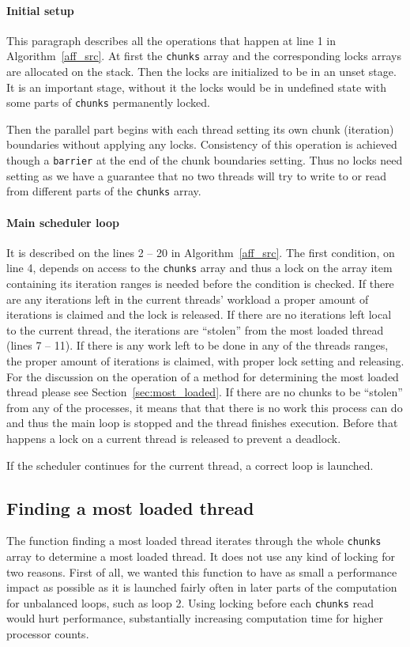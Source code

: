\documentclass[11pt,a4paper]{article}
\begin{document}
\paragraph{Initial setup}
This paragraph describes all the operations that happen at line 1 in Algorithm~\ref{aff_src}.
At first the \texttt{chunks} array and the corresponding locks arrays are allocated on the stack. 
Then the locks are initialized to be in an unset stage.
It is an important stage, without it the locks would be in undefined state with some parts of \texttt{chunks} permanently locked.

Then the parallel part begins with each thread setting its own chunk (iteration) boundaries without applying any locks.
Consistency of this operation is achieved though a \texttt{barrier} at the end of the chunk boundaries setting.
Thus no locks need setting as we have a guarantee that no two threads will try to write to or read from different parts of the \texttt{chunks} array.

\paragraph{Main scheduler loop}
It is described on the lines 2 -- 20 in Algorithm~\ref{aff_src}. 
The first condition, on line 4, depends on access to the \texttt{chunks} array and thus a lock on the array item containing its iteration ranges is needed before the condition is checked.
If there are any iterations left in the current threads' workload a proper amount of iterations is claimed and the lock is released.
If there are no iterations left local to the current thread, the iterations are ``stolen'' from the most loaded thread (lines 7 -- 11).
If there is any work left to be done in any of the threads ranges, the proper amount of iterations is claimed, with proper lock setting and releasing.
For the discussion on the operation of a method for determining the most loaded thread please see Section~\ref{sec:most_loaded}.
If there are no chunks to be ``stolen'' from any of the processes, it means that that there is no work this process can do and thus the main loop is stopped and the thread finishes execution.
Before that happens a lock on a current thread is released to prevent a deadlock.

If the scheduler continues for the current thread, a correct loop is launched.

\subsection{Finding a most loaded thread}
The function finding a most loaded thread iterates through the whole \texttt{chunks} array to determine a most loaded thread.
It does not use any kind of locking for two reasons. 
First of all, we wanted this function to have as small a performance impact as possible as it is launched fairly often in later parts of the computation for unbalanced loops, such as loop 2.
Using locking before each \texttt{chunks} read would hurt performance, substantially increasing computation time for higher processor counts.
\end{document}
